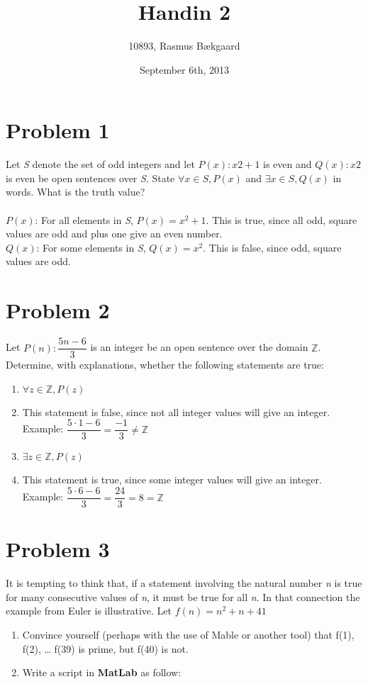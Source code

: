 \documentclass[english,10pt,a4paper]{article}
\title{Handin 2}
\author{10893, Rasmus Bækgaard}
\date{September 6th, 2013}
\begin{document}
\maketitle

\section*{Problem 1}
Let \textit{S} denote the set of odd integers and let $P(x): x2 + 1$ is even and $Q(x): x2$ is even be open sentences over \textit{S}. 
State $\forall x \in S, P(x)$ and $\exists x \in S, Q(x)$ in words. 
What is the truth value?
\\
\\
$P(x)$: For all elements in \textit{S}, $P(x) = x^2 +1$. 
This is true, since all odd, square values are odd and plus one give an even number.
\\
$Q(x)$: For some elements in \textit{S}, $Q(x)=x^2$. This is false, since odd, square values are odd.


\section*{Problem 2}
Let $P(n): \dfrac{5n-6}{3}$ is an integer be an open sentence over the domain $\mathbb{Z}$. Determine, with explanations, whether the following statements are true:
\begin{enumerate}[a]
\item $\forall z \in \mathbb{Z}, P(z)$
\item[] This statement is false, since not all integer values will give an integer. 
Example: $\dfrac{5\cdot 1-6}{3}=\dfrac{-1}{3} \not = \mathbb{Z}$
\item $\exists z \in \mathbb{Z}, P(z)$
\item[] This statement is true, since some integer values will give an integer. 
Example: $\dfrac{5\cdot 6 - 6}{3}=\dfrac{24}{3} = 8  = \mathbb{Z}$
\end{enumerate}



\section*{Problem 3}
It is tempting to think that, if a statement involving the natural number \textit{n} is true for many consecutive values of \textit{n}, it must be true for all \textit{n}. 
In that connection the example from Euler is illustrative.
 Let $f(n) = n^2 + n + 41$ 
\begin{enumerate}[a]

\item Convince yourself (perhaps with the use of Mable or another tool) that f(1), f(2), … f(39) is prime, but f(40) is not. 
\item[] Write a script in \textbf{MatLab} as follow:
\end{enumerate}
\end{document}
